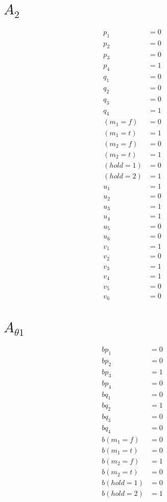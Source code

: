 \documentclass{scrartcl}
\begin{document}
\section*{$A_2$}

\begin{align*}
  p_1 &= 0 \\
  p_2 &= 0 \\
  p_3 &= 0 \\
  p_4 &= 1 \\
  q_1 &= 0 \\
  q_2 &= 0 \\
  q_3 &= 0 \\
  q_4 &= 1 \\
  (m_1=f) &= 0 \\
  (m_1=t) &= 1 \\
  (m_2=f) &= 0 \\
  (m_2=t) &= 1 \\
  (hold=1) &= 0 \\
  (hold=2) &= 1 \\
  u_1 &= 1 \\
  u_2 &= 0 \\
  u_3 &= 1 \\
  u_4 &= 1 \\
  u_5 &= 0 \\
  u_6 &= 0 \\
  v_1 &= 1 \\
  v_2 &= 0 \\
  v_3 &= 1 \\
  v_4 &= 1 \\
  v_5 &= 0 \\
  v_6 &= 0
\end{align*}

\section*{$A_{\theta 1}$}
\begin{align*}
  bp_1 &= 0 \\
  bp_2 &= 0 \\
  bp_3 &= 1 \\
  bp_4 &= 0 \\
  bq_1 &= 0 \\
  bq_2 &= 1 \\
  bq_3 &= 0 \\
  bq_4 &= 0 \\
  b(m_1=f) &= 0 \\
  b(m_1=t) &= 0 \\
  b(m_2=f) &= 1 \\
  b(m_2=t) &= 0 \\
  b(hold=1) &= 0 \\
  b(hold=2) &= 1
\end{align*}
\end{document}

